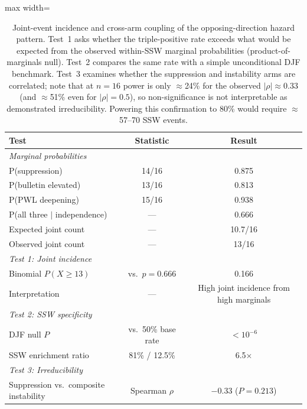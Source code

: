\documentclass[11pt,letterpaper]{article}
\begin{document}

\begin{table}[htbp]
\centering
\caption{Joint-event incidence and cross-arm coupling of the opposing-direction hazard pattern. Test~1 asks whether the triple-positive rate exceeds what would be expected from the observed within-SSW marginal probabilities (product-of-marginals null). Test~2 compares the same rate with a simple unconditional DJF benchmark. Test~3 examines whether the suppression and instability arms are correlated; note that at $n = 16$ power is only $\approx$24\% for the observed $|\rho| \approx 0.33$ (and $\approx$51\% even for $|\rho| = 0.5$), so non-significance is not interpretable as demonstrated irreducibility. Powering this confirmation to 80\% would require $\approx$57--70 SSW events.}
\label{tab:joint_irreducibility}
\begin{adjustbox}{max width=\textwidth}
\begin{tabular}{lcc}
\toprule
\textbf{Test} & \textbf{Statistic} & \textbf{Result} \\
\midrule
\multicolumn{3}{l}{\emph{Marginal probabilities}} \\
\midrule
P(suppression) & 14/16 & 0.875 \\
P(bulletin elevated) & 13/16 & 0.813 \\
P(PWL deepening) & 15/16 & 0.938 \\
P(all three $|$ independence) & --- & 0.666 \\
Expected joint count & --- & 10.7/16 \\
Observed joint count & --- & 13/16 \\
\midrule
\multicolumn{3}{l}{\emph{Test 1: Joint incidence}} \\
\midrule
Binomial $P(X \geq 13)$ & vs.\ $p = 0.666$ & 0.166 \\
Interpretation & --- & High joint incidence from high marginals \\
\midrule
\multicolumn{3}{l}{\emph{Test 2: SSW specificity}} \\
\midrule
DJF null $P$ & vs.\ 50\% base rate & $< 10^{-6}$ \\
SSW enrichment ratio & 81\% / 12.5\% & 6.5$\times$ \\
\midrule
\multicolumn{3}{l}{\emph{Test 3: Irreducibility}} \\
\midrule
Suppression vs.\ composite instability & Spearman $\rho$ & $-0.33$ ($P = 0.213$) \\

\end{tabular}
\end{adjustbox}
\end{table}
\end{document}
